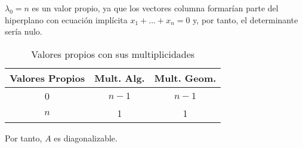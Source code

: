 \begin{ejercicio}
    $\lambda_0 = n$ es un valor propio, ya que los vectores columna formarían parte del hiperplano con ecuación implícita $x_1+\dots +x_n=0$ y, por tanto, el determinante sería nulo.

    \begin{table}[H]
        \centering
        \begin{tabular}{c|c|c}
            Valores Propios & Mult. Alg. & Mult. Geom. \\ \hline 
            0 & $n-1$ & $n-1$\\
            $n$ & 1 & 1\\
        \end{tabular}
        \caption{Valores propios con sus multiplicidades}
    \end{table}

    Por tanto, $A$ es diagonalizable.   
\end{ejercicio}

